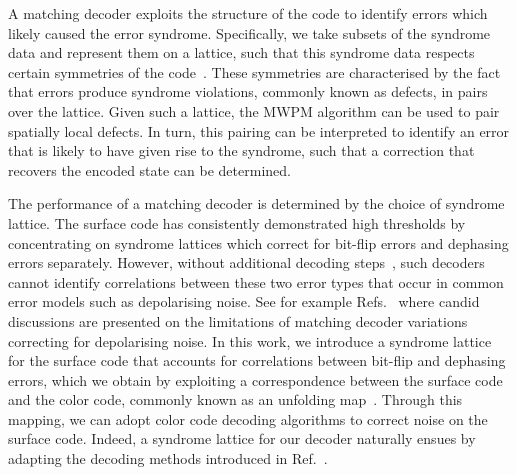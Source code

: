 \documentclass[a4paper,twocolumn,11pt,accepted=2024-12-23]{quantumarticle}
\begin{document}
A matching decoder exploits the structure of the code to identify errors which likely caused the error syndrome. Specifically, we take subsets of the syndrome data and represent them on a lattice, such that this syndrome data respects certain symmetries of the code~\cite{kitaev2003fault, brown2020parallelized, brown2022conservation}. These symmetries are characterised by the fact that errors produce syndrome violations, commonly known as defects, in pairs over the lattice. Given such a lattice, the MWPM algorithm can be used to pair spatially local defects. In turn, this pairing can be interpreted to identify an error that is likely to have given rise to the syndrome, such that a correction that recovers the encoded state can be determined.



The performance of a matching decoder is determined by the choice of syndrome lattice. The surface code has consistently demonstrated high thresholds by concentrating on syndrome lattices which correct for bit-flip errors and dephasing errors separately. However, without additional decoding steps~\cite{fowler2013optimal, delfosse2014decoding, higgott2023improved}, such decoders cannot identify correlations between these two error types that occur in common error models such as depolarising noise. See for example Refs.~\cite{duclos2010fast, fowler2013optimal} where candid discussions are presented on the limitations of matching decoder variations correcting for depolarising noise. In this work, we introduce a syndrome lattice for the surface code that accounts for correlations between bit-flip and dephasing errors, which we obtain by exploiting a correspondence between the surface code and the color code, commonly known as an unfolding map~\cite{bombin2012universal, Kubica_2015, Bhagoji15, criger2016noise}. Through this mapping, we can adopt color code decoding algorithms to correct noise on the surface code. Indeed, a syndrome lattice for our decoder naturally ensues by adapting the decoding methods introduced in Ref.~\cite{sahay2022decoder}.
\end{document}
